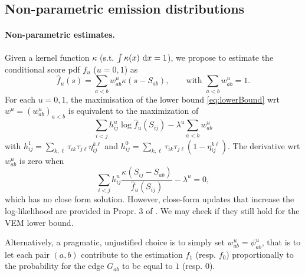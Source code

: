 \subsection{Non-parametric emission distributions} \label{sec:np}

\paragraph{Non-parametric estimates.}
Given a kernel function $\kappa$ (s.t. $\int \kappa(x) \d x = 1$), we propose to estimate the conditional score pdf $f_u$ ($u = 0, 1$) as
$$
\widehat{f}_u(s) = \sum_{a < b} w_{ab}^u \kappa(s - S_{ab}), 
\qquad \text{with } \sum_{a < b} w_{ab}^u  = 1.
$$
For each $u = 0, 1$, the maximisation of the lower bound \eqref{eq:lowerBound} wrt $w^u = (w^u_{ab})_{a < b}$ is equivalent to the maximization of
$$
\sum_{i < j} h^u_{ij} \log \widehat{f}_u(S_{ij}) - \lambda^u \sum_{a < b} w_{ab}^u
$$
with
$h^1_{ij} = \sum_{k, \ell} \tau_{ik} \tau_{j\ell} \eta^{k\ell}_{ij}$ and $h^0_{ij} = \sum_{k, \ell} \tau_{ik} \tau_{j\ell} (1 - \eta^{k\ell}_{ij})$. The derivative wrt $w^u_{ab}$ is zero when
$$
\sum_{i < j} h^u_{ij} \frac{\kappa(S_{ij} - S_{ab})}{\widehat{f}_u(S_{ij})} - \lambda^u = 0,
$$
which has no close form solution. However, close-form updates that increase the log-likelihood are provided in Propr. 3 of \cite{GCR16}. We may check if they still hold for the VEM lower bound.

Alternatively, a pragmatic, unjustified choice is to simply set $w^u_{ab} = \psi^u_{ab}$, that is to let each pair $(a, b)$ contribute to the estimation $f_1$ (resp. $f_0$) proportionally to the probability for the edge $G_{ab}$ to be equal to $1$ (resp. $0$).
